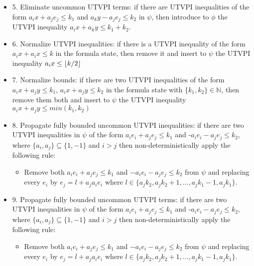 \begin{itemize}
  \item[] 5. Eliminate uncommon UTVPI terms: 
    if there are UTVPI inequalities of the form $a_i x + a_j e_j \leq k_1$
    and $a_k y - a_j e_j \leq k_2$ in $\psi$, then introduce to $\phi$ the 
    UTVPI inequality $a_i x + a_k y \leq k_1 + k_2$.

  \item[] 6. Normalize UTVPI inequalities:
    if there is a UTVPI inequality of the form $a_i x + a_i x \leq k$ in 
    the formula state, then remove it and insert to $\psi$ the UTVPI
    inequality $a_i x \leq \lfloor k/2 \rfloor$

  \item[] 7.  Normalize bounds:
    if there are two UTVPI inequalities of the form $a_i x + a_j y \leq k_1$,
    $a_i x + a_j y \leq k_2$ in 
    the formula state with $\{k_1, k_2\} \in \mathbb{N}$, 
    then remove them both and insert to $\psi$ the UTVPI
    inequality $a_i x + a_j y \leq min(k_1, k_2)$

  \item[] 8.  Propagate fully bounded uncommon UTVPI inequalities: 
    if there are two UTVPI inequalities 
    in $\psi$ of the form $a_i e_i + a_j e_j \leq k_1$ and -$a_i e_i - a_j e_j \leq k_2$, 
    where $\{a_i, a_j\} \subseteq \{1, -1\}$ and $i > j$ 
    then  non-deterministically apply the following rule:
    \begin{itemize}
      \item Remove both $a_i e_i + a_j e_j \leq k_1$ and $-a_i e_i - a_j e_j \leq k_2$
        from $\psi$ and replacing every $e_i$ by $e_j = l + a_j a_i e_i$ where $
        l \in \{a_j k_2, a_j k_2 + 1, \dots, a_j k_1 - 1, a_j k_1\}$.
    \end{itemize}

  \item[] 9.  Propagate fully bounded uncommon UTVPI terms: 
    if there are two UTVPI inequalities 
    in $\psi$ of the form $a_i e_i + a_j e_j \leq k_1$ and -$a_i e_i - a_j e_j \leq k_2$, 
    where $\{a_i, a_j\} \subseteq \{1, -1\}$ and $i > j$ 
    then  non-deterministically apply the following rule:
    \begin{itemize}
      \item Remove both $a_i e_i + a_j e_j \leq k_1$ and $-a_i e_i - a_j e_j \leq k_2$
        from $\psi$ and replacing every $e_i$ by $e_j = l + a_j a_i e_i$ where $
        l \in \{a_j k_2, a_j k_2 + 1, \dots, a_j k_1 - 1, a_j k_1\}$.
    \end{itemize}
\end{itemize} 

